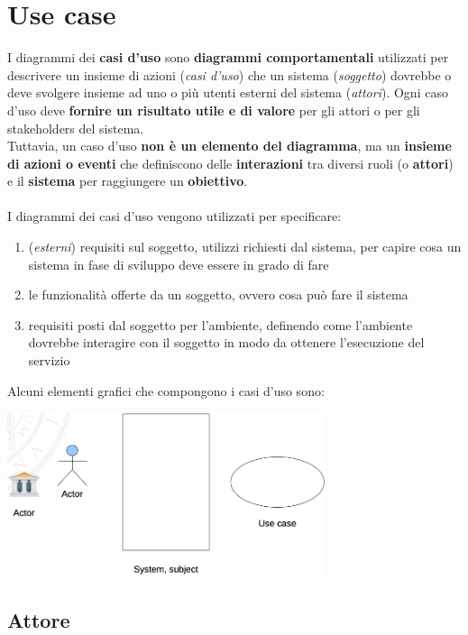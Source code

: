 \documentclass{article}
\begin{document}
\pagestyle{empty}

\section*{Use case}
\large

I diagrammi dei \textbf{casi d'uso} sono \textbf{diagrammi comportamentali} utilizzati per descrivere un insieme di azioni (\textit{casi d'uso}) che un sistema (\textit{soggetto}) dovrebbe o deve svolgere insieme ad uno o più utenti esterni del sistema (\textit{attori}). Ogni caso d'uso deve \textbf{fornire un risultato utile e di valore} per gli attori o per gli stakeholders del sistema. \\
Tuttavia, un caso d'uso \textbf{non è un elemento del diagramma}, ma un \textbf{insieme di azioni o eventi} che definiscono delle \textbf{interazioni} tra diversi ruoli (o \textbf{attori}) e il \textbf{sistema} per raggiungere un \textbf{obiettivo}. \\ \\
I diagrammi dei casi d'uso vengono utilizzati per specificare:
\begin{enumerate}
    \renewcommand{\labelenumi}{-}
    \item (\textit{esterni}) requisiti sul soggetto, utilizzi richiesti dal sistema, per capire cosa un sistema in fase di sviluppo deve essere in grado di fare 
    \item le funzionalità offerte da un soggetto, ovvero cosa può fare il sistema
    \item requisiti posti dal soggetto per l'ambiente, definendo come l'ambiente dovrebbe interagire con il soggetto in modo da ottenere l'esecuzione del servizio
\end{enumerate}
Alcuni elementi grafici che compongono i casi d'uso sono:
\begin{center}
    \includegraphics[width=0.7\textwidth]{foto 1.png}
\end{center}

\subsection*{Attore}
\large
\end{document}
